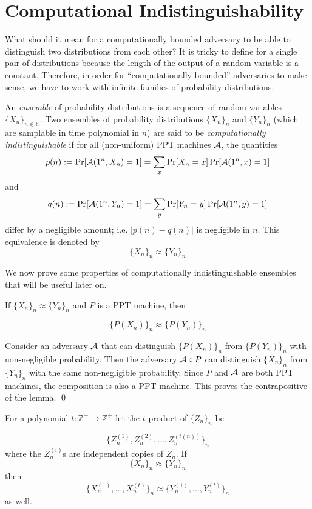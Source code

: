 



\section{Computational Indistinguishability}

What should it mean for a computationally bounded adversary to be able to distinguish two distributions from each other? It is tricky to define for a single pair of distributions because the length of the output of a random variable is a constant. Therefore, in order for ``computationally bounded'' adversaries to make sense, we have to work with infinite families of probability distributions.

\begin{definition}
An \emph{ensemble} of probability distributions is a sequence of random variables $\{X_n\}_{n\in \mathbb{N}}$. Two ensembles of probability distributions $\{X_n\}_n$ and $\{Y_n\}_n$ (which are samplable in time polynomial in $n$) are said to be \emph{computationally indistinguishable} if for all (non-uniform) PPT machines ${\mathcal A}$, the quantities
$$p(n) := \Pr[{\mathcal A}(1^n, X_n) = 1] = \sum_x \Pr[X_n = x]\Pr[{\mathcal A}(1^n,x) = 1]$$
and
$$q(n) := \Pr[{\mathcal A}(1^n,Y_n) = 1] = \sum_y \Pr[Y_n = y]\Pr[{\mathcal A}(1^n,y) = 1]$$
differ by a negligible amount; i.e. $|p(n) - q(n)|$ is negligible in $n$.    
This equivalence is denoted by
$$\{X_n\}_n\approx \{Y_n\}_n$$
\end{definition}
We now prove some properties of computationally indistinguishable ensembles that will be useful later on.

\begin{lemma}
If $\{X_n\}_n\approx\{Y_n\}_n$ and $P$ is a PPT machine, then

$$\{P(X_n)\}_n\approx \{P(Y_n)\}_n$$
\end{lemma}

\proof
Consider an adversary ${\mathcal A}$ that can distinguish $\{P(X_n)\}_n$ from $\{P(Y_n)\}_n$ with non-negligible probability. Then the adversary ${\mathcal A}\circ P$ can distinguish $\{X_n\}_n$ from $\{Y_n\}_n$ with the same non-negligible probability. Since $P$ and ${\mathcal A}$ are both PPT machines, the composition is also a PPT machine. This proves the contrapositive of the lemma.
\qed


\begin{lemma}
For a polynomial $t:\mathbb{Z}^+\rightarrow\mathbb{Z}^+$ let the $t$-product of $\{Z_n\}_n$ be

$$\{Z_n^{(1)}, Z_n^{(2)},\hdots, Z_n^{(t(n))}\}_n$$
where the $Z_n^{(i)}$s are independent copies of $Z_n$. If
$$\{X_n\}_n\approx\{Y_n\}_n$$
then
$$\{X_n^{(1)},\hdots,X_n^{(t)}\}_n\approx\{Y_n^{(1)},\hdots,Y_n^{(t)}\}_n$$
as well.
\end{lemma}

